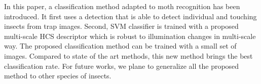 \documentclass[a4paper,conference]{IEEEtran}
\begin{document}
In this paper, a classification method adapted to moth recognition has been introduced. It first uses a detection that is able to detect individual and touching insects from trap images. Second, SVM classifier is trained with a proposed multi-scale HCS descriptor which is robust to illumination changes in multi-scale way. The proposed classification method can be trained with a small set of images. Compared to state of the art methods, this new method brings the best classification rate. 
For future works, %
we plane to generalize all the proposed method to other species of insects. 

\end{document}
